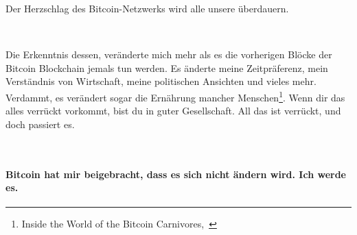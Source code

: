 Der Herzschlag des Bitcoin-Netzwerks wird alle unsere überdauern.

~

Die Erkenntnis dessen, veränderte mich mehr als es die vorherigen Blöcke der
Bitcoin Blockchain jemals tun werden. Es änderte meine Zeitpräferenz, mein
Verständnis von Wirtschaft, meine politischen Ansichten und vieles mehr.
Verdammt, es verändert sogar die Ernährung mancher Menschen\footnote{Inside the
World of the Bitcoin Carnivores,~\cite{carnivores}}. Wenn dir das alles verrückt
vorkommt, bist du in guter Gesellschaft. All das ist verrückt, und doch passiert
es.

~

\paragraph{Bitcoin hat mir beigebracht, dass es sich nicht ändern wird. Ich werde es.}

%
%
%
%
%
%
%
%
%

